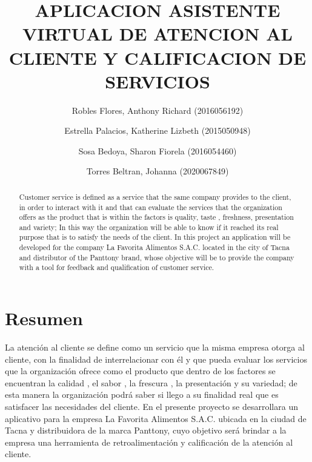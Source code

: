 \documentclass[preprint,12pt]{elsarticle}
\begin{document}
	
	\begin{frontmatter}

		\title{\huge  APLICACION ASISTENTE VIRTUAL DE ATENCION AL CLIENTE Y CALIFICACION DE SERVICIOS}
		
		\author{Robles Flores, Anthony Richard	                (2016056192)}
		\author{Estrella Palacios, Katherine Lizbeth			(2015050948)}
		\author{Sosa Bedoya, Sharon Fiorela				(2016054460)}
		\author{Torres Beltran, Johanna				(2020067849)}
		\address{Tacna, Perú}
		
		
		\begin{abstract}
Customer service is defined as a service that the same company provides to the client, in order to interact with it and that can evaluate the services that the organization offers as the product that is within the factors is quality, taste , freshness, presentation and variety; In this way the organization will be able to know if it reached its real purpose that is to satisfy the needs of the client. In this project an application will be developed for the company La Favorita Alimentos S.A.C. located in the city of Tacna and distributor of the Panttony brand, whose objective will be to provide the company with a tool for feedback and qualification of customer service.
		\end{abstract}
\end{frontmatter}

\section{Resumen}
La atención al cliente se define como un servicio que la misma empresa otorga al cliente, con la finalidad de interrelacionar con él y que pueda evaluar los servicios que la organización ofrece como el producto que dentro de los factores se encuentran la calidad , el sabor , la frescura , la presentación y su variedad; de esta  manera la organización podrá saber si llego a su finalidad real que es satisfacer las necesidades del cliente. En el presente proyecto se desarrollara un aplicativo para la empresa La Favorita Alimentos S.A.C. ubicada en la ciudad de Tacna y distribuidora de la marca Panttony, cuyo objetivo será brindar a la empresa una herramienta de retroalimentación y calificación de la atención al cliente.
\end{document}
